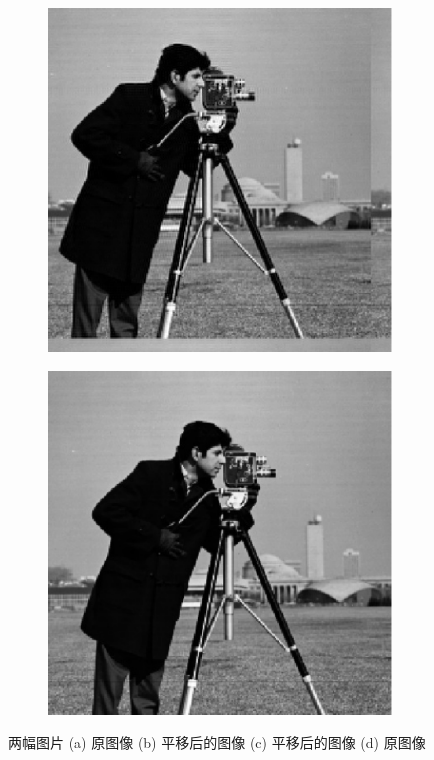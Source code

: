 \begin{figure}[htb!]
    \begin{subfigure}{.2\textwidth}
        \centering
        \includegraphics[width=\textwidth]{./img/im2.pdf}
        \caption{}
        \label{fig:cameraman2_3}
    \end{subfigure}
    \begin{subfigure}{.2\textwidth}
        \centering
        \includegraphics[width=\textwidth]{./img/im1.pdf}
        \caption{}
        \label{fig:cameraman2_4}
    \end{subfigure}
    \caption{两幅图片 (a) 原图像 (b) 平移后的图像 (c) 平移后的图像 (d) 原图像}
    \label{fig:cameraman2}
\end{figure}

